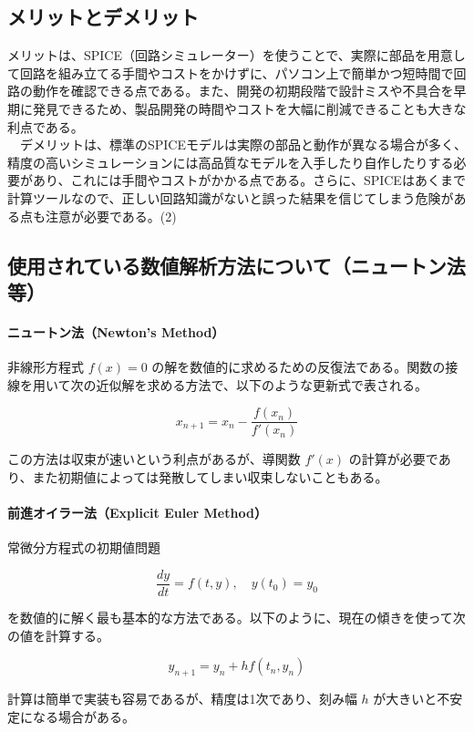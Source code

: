 \documentclass{jlreq}
\numberwithin{equation}{section}
\begin{document}
\subsection{メリットとデメリット}
メリットは、SPICE（回路シミュレーター）を使うことで、実際に部品を用意して回路を組み立てる手間やコストをかけずに、パソコン上で簡単かつ短時間で回路の動作を確認できる点である。また、開発の初期段階で設計ミスや不具合を早期に発見できるため、製品開発の時間やコストを大幅に削減できることも大きな利点である。\\
　デメリットは、標準のSPICEモデルは実際の部品と動作が異なる場合が多く、精度の高いシミュレーションには高品質なモデルを入手したり自作したりする必要があり、これには手間やコストがかかる点である。さらに、SPICEはあくまで計算ツールなので、正しい回路知識がないと誤った結果を信じてしまう危険がある点も注意が必要である。(2)

\subsection{使用されている数値解析方法について（ニュートン法等）}
\paragraph{ニュートン法（Newton's Method）}
非線形方程式 \( f(x) = 0 \) の解を数値的に求めるための反復法である。関数の接線を用いて次の近似解を求める方法で、以下のような更新式で表される。

\[
x_{n+1} = x_n - \frac{f(x_n)}{f'(x_n)}
\]

この方法は収束が速いという利点があるが、導関数 \( f'(x) \) の計算が必要であり、また初期値によっては発散してしまい収束しないこともある。\\

\paragraph{前進オイラー法（Explicit Euler Method）}

常微分方程式の初期値問題

\[
\frac{dy}{dt} = f(t, y), \quad y(t_0) = y_0
\]

を数値的に解く最も基本的な方法である。以下のように、現在の傾きを使って次の値を計算する。

\[
y_{n+1} = y_n + h f(t_n, y_n)
\]

計算は簡単で実装も容易であるが、精度は1次であり、刻み幅 \( h \) が大きいと不安定になる場合がある。\\
\end{document}
